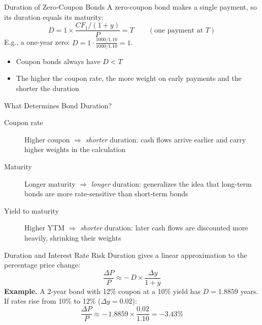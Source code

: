 \documentclass[aspectratio=169]{beamer}
\begin{document}
\begin{frame}{Duration of Zero-Coupon Bonds}
A zero-coupon bond makes a single payment, so its duration equals its maturity:
\[
D = 1 \times \frac{CF_1/(1+y)}{P} = T \qquad (\text{one payment at } T)
\]
E.g., a one-year zero: $D = 1 \cdot \frac{1000/1.10}{1000/1.10} = 1$.
\vspace{0.3em}
\begin{itemize}
  \item Coupon bonds always have $D < T$
  \item The higher the coupon rate, the more weight on early payments and the shorter the duration
\end{itemize}
\end{frame}

\begin{frame}{What Determines Bond Duration?}
\begin{description}
  \item[Coupon rate] Higher coupon $\Rightarrow$ \emph{shorter} duration: cash flows arrive earlier and carry higher weights in the calculation
  \item[Maturity] Longer maturity $\Rightarrow$ \emph{longer} duration: generalizes the idea that long-term bonds are more rate-sensitive than short-term bonds
  \item[Yield to maturity] Higher YTM $\Rightarrow$ \emph{shorter} duration: later cash flows are discounted more heavily, shrinking their weights
\end{description}
\end{frame}

\begin{frame}{Duration and Interest Rate Risk}
Duration gives a linear approximation to the percentage price change:
\[
\frac{\Delta P}{P} \approx -\,D \times \frac{\Delta y}{1+y}
\]
\textbf{Example.} A 2-year bond with 12\% coupon at a 10\% yield has $D = 1.8859$ years. If rates rise from 10\% to 12\% ($\Delta y = 0.02$):
\[
\frac{\Delta P}{P} \approx -\,1.8859 \times \frac{0.02}{1.10} = -3.43\%
\]
\end{frame}
\end{document}
